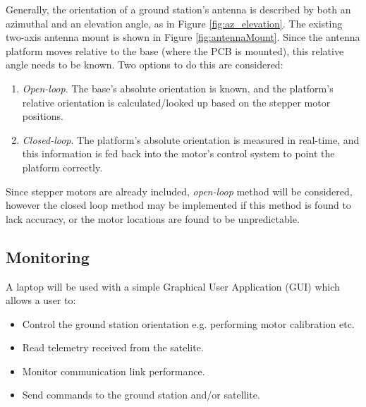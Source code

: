 Generally, the orientation of a ground station's antenna is described by both an azimuthal and an elevation angle, as in Figure \ref{fig:az_elevation}. The existing two-axis antenna mount is shown in Figure \ref{fig:antennaMount}. Since the antenna platform moves relative to the base (where the PCB is mounted), this relative angle needs to be known. Two options to do this are considered:
\begin{enumerate}
    \item \textit{Open-loop}. The base's absolute orientation is known, and the platform's relative orientation is calculated/looked up based on the stepper motor positions.
    \item \textit{Closed-loop}. The platform's absolute orientation is measured in real-time, and this information is fed back into the motor's control system to point the platform correctly.
\end{enumerate}

Since stepper motors are already included, \textit{open-loop} method will be considered, however the closed loop method may be implemented if this method is found to lack accuracy, or the motor locations are found to be unpredictable.

\subsection{Monitoring}
A laptop will be used with a simple Graphical User Application (GUI) which allows a user to:
\begin{itemize}
    \item Control the ground station orientation e.g. performing motor calibration etc.
    \item Read telemetry received from the satelite.
    \item Monitor communication link performance.
    \item Send commands to the ground station and/or satellite.
\end{itemize}